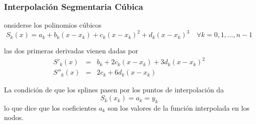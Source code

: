 \documentclass[10pt]{beamer}
\begin{document}
\begin{frame}
  \frametitle{Interpolaci\'on Segmentaria C\'ubica}
  onsiderse los polinomios c\'ubicos
$$
S_k(x) = a_k + b_k(x - x_k) + c_k (x - x_k)^2 + d_k (x - x_k)^3 \quad \forall k=0,1,\ldots,n-1
$$

las dos primeras derivadas vienen dadas por
\begin{eqnarray}
 \nonumber S'_k(x) & = & b_k + 2c_k(x - x_k) + 3d_k(x - x_k)^2\\
 \nonumber S''_k(x) & = & 2c_k + 6d_k(x - x_k)
\end{eqnarray}

La condici\'on de que los splines pasen por los puntos de interpolaci\'on da 
$$
S_k(x_k) = a_k = y_k
$$
lo que dice que los coeficientes $a_k$ son los valores de la funci\'on interpolada en los nodos. 

  

\end{frame}
\end{document}
